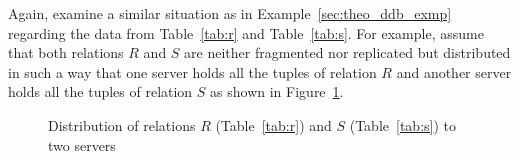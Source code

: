 \begin{exmp} \label{sec:theo_dqp_exmp}
Again, examine a similar situation as in Example~\ref{sec:theo_ddb_exmp} regarding the data from Table~\ref{tab:r} and Table~\ref{tab:s}. For example, 
assume that both relations $R$ and $S$ are neither fragmented nor replicated but distributed in such a way that one server holds all the tuples of 
relation $R$ and another server holds all the tuples of relation $S$ as shown in Figure~\ref{fig:dqp_rs_simple}.


\begin{figure}[h]
\caption{Distribution of relations $R$ (Table~\ref{tab:r}) and $S$ (Table~\ref{tab:s}) to two servers}
\label{fig:dqp_rs_simple}
\end{figure}



\end{exmp}
